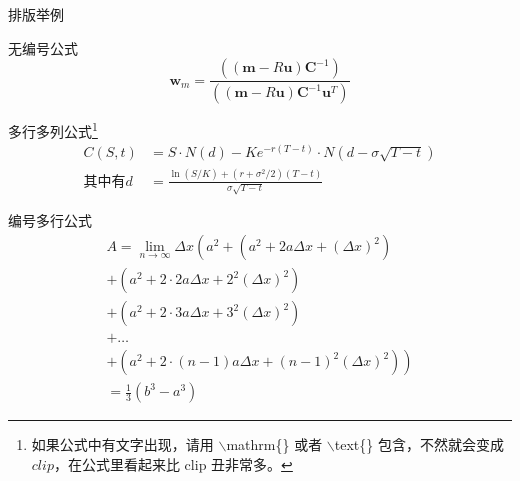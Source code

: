 \documentclass{beamer}
\begin{document}
\begin{frame}{排版举例}
    \begin{exampleblock}{无编号公式} %
        \begin{equation*}
            \mathbf w_m = \frac{((\mathbf m - R\mathbf u)\mathbf C^{-1})}{((\mathbf m - R\mathbf u)\mathbf C^{-1}\mathbf u^T)}
        \end{equation*}

    \end{exampleblock}
    \begin{exampleblock}{多行多列公式\footnote{如果公式中有文字出现，请用 $\backslash$mathrm\{\} 或者 $\backslash$text\{\} 包含，不然就会变成 $clip$，在公式里看起来比 $\mathrm{clip}$ 丑非常多。}}
        \begin{align}
            C(S, t) &= S \cdot N(d) - K e^{-r(T-t)} \cdot N(d - \sigma \sqrt{T-t})
       \\ \text{其中有}d &= \frac{\ln(S/K) + (r + \sigma^2/2)(T-t)}{\sigma \sqrt{T-t}}
        \end{align}
    \end{exampleblock}
\end{frame}

\begin{frame}
    \begin{exampleblock}{编号多行公式}
        \begin{multline}
            A=\lim_{n\rightarrow\infty}\Delta x\left(a^{2}+\left(a^{2}+2a\Delta x+\left(\Delta x\right)^{2}\right)\right.\label{eq:reset}\\
            +\left(a^{2}+2\cdot2a\Delta x+2^{2}\left(\Delta x\right)^{2}\right)\\
            +\left(a^{2}+2\cdot3a\Delta x+3^{2}\left(\Delta x\right)^{2}\right)\\
            +\ldots\\
            \left.+\left(a^{2}+2\cdot(n-1)a\Delta x+(n-1)^{2}\left(\Delta x\right)^{2}\right)\right)\\
            =\frac{1}{3}\left(b^{3}-a^{3}\right)
        \end{multline}
    \end{exampleblock}
\end{frame}
\end{document}

